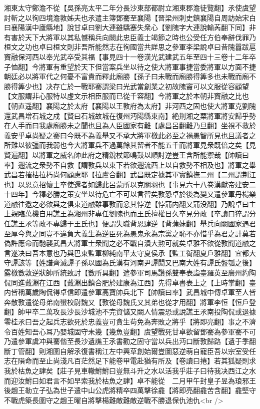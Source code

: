 湘東太守鄭澹不從【吳孫亮太平二年分長沙東部都尉立湘東郡澹徒覽翻】氶使虞望討斬之以徇四境澹敦姊夫也氶遣主簿鄧騫至襄陽【晉梁州刺史鎮襄陽自周訪始宋白曰襄陽漢中廬縣地】說甘卓曰劉大連雖驕蹇失衆心【劉隗字大連說輸芮翻下同】非有害於天下大將軍以其私憾稱兵向闕此忠臣義士竭節之時也公受任方伯奉辭伐罪乃桓文之功也卓曰桓文則非吾所能然志在徇國當共詳思之參軍李梁說卓曰昔隗囂跋扈竇融保河西以奉光武卒受其福【事見四十一卷漢光武建武五年至四十三卷十二年卒子恤翻】今將軍有重望於天下但當案兵坐以待之使大將軍事捷當委將軍以方面不捷朝廷必以將軍代之何憂不富貴而釋此廟勝【孫子曰未戰而廟勝得筭多也未戰而廟不勝得筭少也】决存亡於一戰耶騫謂梁曰光武當創業之初故隗竇可以文服從容顧望【文服謂非心服特以虛文示相臣服而已從千容翻】今將軍之於本朝非竇融之比也【朝直遥翻】襄陽之於太府【襄陽以王敦府為太府】非河西之固也使大將軍克劉隗還武昌增石城之戍【賢曰石城故城在復州沔陽縣東南】絶荆湘之粟將軍將安歸乎勢在人手而曰我處廟勝未之聞也且為人臣國家有難【處昌呂翻難乃旦翻】坐視不救於義安乎卓尚疑之騫曰今既不為義舉又不承大將軍檄此必至之禍愚智所見也且議者之所難以彼彊而我弱也今大將軍兵不過萬餘其留者不能五千而將軍見衆既倍之矣【見賢遍翻】以將軍之威名帥此府之精銳杖節鳴鼓以順討逆豈王含所能禦哉【帥讀曰率】遡流之衆勢不自救【謂敦兵以東下若欲遡流西上以自救勢不相及也】將軍之舉武昌若摧枯拉朽尚何顧慮耶【拉盧合翻】武昌既定據其軍實鎮撫二州【二州謂荆江也】以恩意招懷士卒使還者如歸此呂蒙所以克關羽也【事見六十八卷漢獻帝建安二十四年】今釋必勝之策安坐以待危亡不可以言智矣敦恐卓於後為變又遣參軍丹楊樂道融往邀之必欲與之俱東道融雖事敦而忿其悖逆【悖蒲内翻又蒲没翻】乃說卓曰主上親臨萬機自用譙王為湘州非專任劉隗也而王氏擅權日久卒見分政【卒讀曰猝謂分任譙王氶等政不專歸于王氏也】便謂失職背恩肆逆【背蒲妹翻】舉兵向闕國家遇君至厚今與之同豈不違負大義生為逆臣死為愚鬼永為宗黨之恥不亦惜乎為君之計莫若偽許應命而馳襲武昌大將軍士衆聞之必不戰自潰大勲可就矣卓雅不欲從敦聞道融之言遂决曰吾本意也乃與巴東監軍柳純南平太守夏侯承【監工䘖翻夏戶雅翻】宜都大守譚該等【姓譜齊滅譚子孫以國為氏漢有河南尹譚閎又巴南大姓有譚氏盤瓠之後】露檄數敦逆狀帥所統致討【數所具翻】遣參軍司馬讚孫雙奉表詣臺羅英至廣州約陶侃同進戴淵在江西【戴淵出鎮合肥於建康為江西】先得卓書表上之【上時掌翻】臺内皆稱萬歲陶侃得卓信即遣參軍高寶帥兵北下【帥讀曰率】武昌城中傳卓軍至人皆奔散敦遣從母弟南蠻校尉魏又【敦從母魏氏又其弟也從才用翻】將軍李恒【恒戶登翻】帥甲卒二萬攻長沙長沙城池不完資儲又闕人情震恐或說譙王氶南投陶侃或退據零桂氶曰吾之起兵志欲死於忠義豈可貪生苟免為奔敗之將乎【將即亮翻】事之不濟令百姓知吾心耳乃嬰城固守未幾【幾魚豈翻】虞望戰死甘卓欲留鄧騫為參軍騫不可乃遣參軍虞冲與騫偕至長沙遺譙王氶書勸之固守當以兵出沔口斷敦歸路【遺于季翻斷丁管翻】則湘圍自解氶復書稱江左中興草創始爾豈圖惡逆萌自寵臣吾以宗室受任志在隕命而至止尚淺凡百茫然足下能卷甲電赴猶有所及【卷讀曰捲】若其狐疑則求我於枯魚之肆矣【莊子見車轍鮒鮒曰豈無斗升之水以活我乎莊子曰待我决西江之水而迎汝鮒曰如君言不如早索我於枯魚之肆】卓不能從　二月甲午封皇子昱為琅邪王　後趙王勒立子弘為世子遣中山公虎將精卒四萬擊徐龕【將即亮翻龕苦含翻】龕堅守不戰虎築長圍守之趙王曜自將擊楊難敵難敵逆戰不勝退保仇池仇<br />
